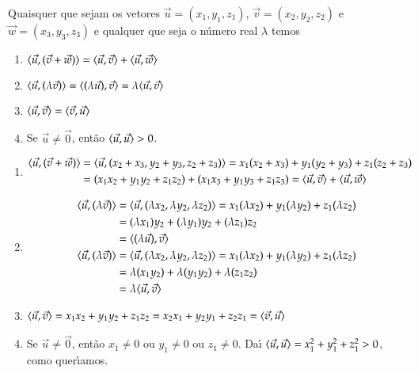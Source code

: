 \begin{proposicao}\label{propriedades-produto-vetorial-espaco}
  Quaisquer que sejam os vetores $\vec{u} = (x_1, y_1,z_1)$, $\vec{v} = (x_2, y_2,z_2)$ e $\vec{w} = (x_3, y_3,z_3)$ e qualquer que seja o n\'umero real $\lambda$ temos
  \begin{enumerate}[label=({\roman*})]
    \item\label{linearidade-soma-produto-vetorial-espaco} $\langle\vec{u}, (\vec{v} + \vec{w})\rangle = \langle \vec{u}, \vec{v} \rangle + \langle \vec{u}, \vec{w} \rangle$
    \item\label{linearidade-escalar-produto-vetorial-espaco} $\langle\vec{u}, (\lambda\vec{v})\rangle = \langle(\lambda\vec{u}), \vec{v}\rangle = \lambda\langle \vec{u}, \vec{v} \rangle$
    \item $\langle \vec{u}, \vec{v} \rangle = \langle \vec{v}, \vec{u} \rangle$
    \item Se $\vec{u} \ne \vec{0}$, ent\~ao $\langle \vec{u}, \vec{u} \rangle > 0$.
  \end{enumerate}
\end{proposicao}
\begin{prova}
  \begin{enumerate}[label=({\roman*})]
    \item \begin{align*}
      \langle\vec{u}, (\vec{v} + \vec{w})\rangle &= \langle\vec{u}, (x_2 + x_3, y_2 + y_3, z_2 + z_3)\rangle = x_1(x_2 + x_3) + y_1(y_2 + y_3) + z_1(z_2+z_3) \\ &= (x_1x_2 + y_1y_2 + z_1z_2) + (x_1x_3 + y_1y_3 + z_1z_3) = \langle \vec{u}, \vec{v} \rangle + \langle \vec{u}, \vec{w} \rangle
    \end{align*}
    \item \begin{align*}
      \langle\vec{u}, (\lambda\vec{v})\rangle &= \langle\vec{u}, (\lambda x_2, \lambda y_2, \lambda z_2)\rangle = x_1(\lambda x_2) + y_1(\lambda y_2) + z_1(\lambda z_2)\\ &= (\lambda x_1)y_2 + (\lambda y_1)y_2 + (\lambda z_1)z_2 \\ &= \langle(\lambda\vec{u}), \vec{v}\rangle\\
      \langle\vec{u}, (\lambda\vec{v})\rangle &= \langle\vec{u}, (\lambda x_2, \lambda y_2, \lambda z_2)\rangle = x_1(\lambda x_2) + y_1(\lambda y_2) + z_1(\lambda z_2)\\ &= \lambda (x_1y_2) + \lambda (y_1y_2) + \lambda(z_1z_2) \\ &= \lambda\langle \vec{u}, \vec{v} \rangle
    \end{align*}
    \item $\langle \vec{u}, \vec{v} \rangle = x_1x_2 + y_1y_2 + z_1z_2 = x_2x_1 + y_2y_1 + z_2z_1 = \langle \vec{v}, \vec{u} \rangle$
    \item Se $\vec{u} \ne \vec{0}$, ent\~ao $x_1 \ne 0$ ou $y_1 \ne 0$ ou $z_1 \ne 0$. Da{\'\i} $\langle \vec{u}, \vec{u} \rangle = x_1^2 + y_1^2 + z_1^2> 0$, como quer{\'\i}amos.
  \end{enumerate}
\end{prova}

